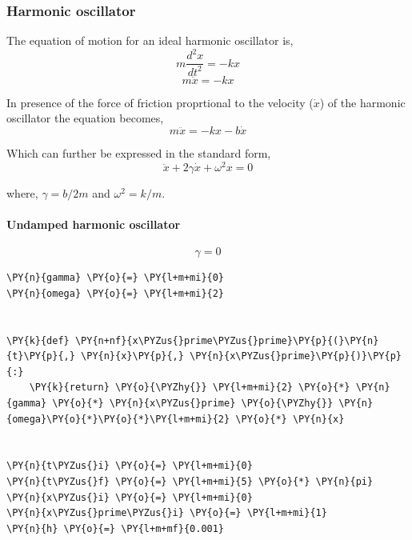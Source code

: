     \hypertarget{harmonic-oscillator}{%
\subsubsection{Harmonic oscillator}\label{harmonic-oscillator}}

    The equation of motion for an ideal harmonic oscillator is,
\[m \frac{d^2x}{dt^2} = -kx\] \[m \ddot x = -kx\]

In presence of the force of friction proprtional to the velocity
(\(\dot x\)) of the harmonic oscillator the equation becomes,
\[m \ddot x = -kx - b \dot x\]

Which can further be expressed in the standard form,
\[\ddot x + 2 \gamma \dot x + \omega^2 x = 0\]

where, \(\gamma = b/2m\) and \(\omega^2 = k/m\).

    \hypertarget{undamped-harmonic-oscillator}{%
\paragraph{Undamped harmonic
oscillator}\label{undamped-harmonic-oscillator}}

\[\gamma = 0\]

    \begin{tcolorbox}[breakable, size=fbox, boxrule=1pt, pad at break*=1mm,colback=cellbackground, colframe=cellborder]
\begin{Verbatim}[commandchars=\\\{\}]
\PY{n}{gamma} \PY{o}{=} \PY{l+m+mi}{0}
\PY{n}{omega} \PY{o}{=} \PY{l+m+mi}{2}


\PY{k}{def} \PY{n+nf}{x\PYZus{}prime\PYZus{}prime}\PY{p}{(}\PY{n}{t}\PY{p}{,} \PY{n}{x}\PY{p}{,} \PY{n}{x\PYZus{}prime}\PY{p}{)}\PY{p}{:}
    \PY{k}{return} \PY{o}{\PYZhy{}} \PY{l+m+mi}{2} \PY{o}{*} \PY{n}{gamma} \PY{o}{*} \PY{n}{x\PYZus{}prime} \PY{o}{\PYZhy{}} \PY{n}{omega}\PY{o}{*}\PY{o}{*}\PY{l+m+mi}{2} \PY{o}{*} \PY{n}{x}


\PY{n}{t\PYZus{}i} \PY{o}{=} \PY{l+m+mi}{0}
\PY{n}{t\PYZus{}f} \PY{o}{=} \PY{l+m+mi}{5} \PY{o}{*} \PY{n}{pi}
\PY{n}{x\PYZus{}i} \PY{o}{=} \PY{l+m+mi}{0}
\PY{n}{x\PYZus{}prime\PYZus{}i} \PY{o}{=} \PY{l+m+mi}{1}
\PY{n}{h} \PY{o}{=} \PY{l+m+mf}{0.001}
\end{Verbatim}
\end{tcolorbox}

